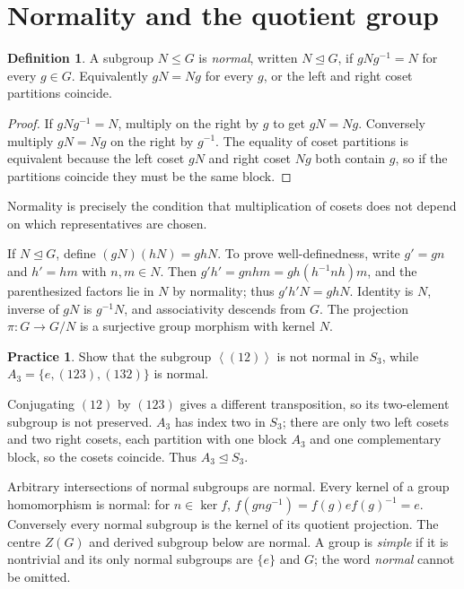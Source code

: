 \documentclass[11pt,openany]{book}
\newcommand{\angles}[1]{\left\langle#1\right\rangle}
\theoremstyle{definition}
\newtheorem{definition}[theorem]{Definition}
\newtheorem{exercise}[theorem]{Practice}
\begin{document}
\section{Normality and the quotient group}
\begin{definition}A subgroup $N\le G$ is \emph{normal}, written $N\trianglelefteq G$, if $gNg^{-1}=N$ for every $g\in G$. Equivalently $gN=Ng$ for every $g$, or the left and right coset partitions coincide.\end{definition}
\begin{proof}If $gNg^{-1}=N$, multiply on the right by $g$ to get $gN=Ng$. Conversely multiply $gN=Ng$ on the right by $g^{-1}$. The equality of coset partitions is equivalent because the left coset $gN$ and right coset $Ng$ both contain $g$, so if the partitions coincide they must be the same block.\end{proof}
\begin{intuition}Normality is precisely the condition that multiplication of cosets does not depend on which representatives are chosen.\end{intuition}
If $N\trianglelefteq G$, define $(gN)(hN)=ghN$. To prove well-definedness, write $g'=gn$ and $h'=hm$ with $n,m\in N$. Then $g'h'=gnhm=gh(h^{-1}nh)m$, and the parenthesized factors lie in $N$ by normality; thus $g'h'N=ghN$. Identity is $N$, inverse of $gN$ is $g^{-1}N$, and associativity descends from $G$. The projection $\pi:G\to G/N$ is a surjective group morphism with kernel $N$.
\begin{exercise}Show that the subgroup $\angles{(12)}$ is not normal in $S_3$, while $A_3=\{e,(123),(132)\}$ is normal.\end{exercise}
\begin{solution}Conjugating $(12)$ by $(123)$ gives a different transposition, so its two-element subgroup is not preserved. $A_3$ has index two in $S_3$; there are only two left cosets and two right cosets, each partition with one block $A_3$ and one complementary block, so the cosets coincide. Thus $A_3\trianglelefteq S_3$.\end{solution}
Arbitrary intersections of normal subgroups are normal. Every kernel of a group homomorphism is normal: for $n\in\ker f$, $f(gng^{-1})=f(g)ef(g)^{-1}=e$. Conversely every normal subgroup is the kernel of its quotient projection. The centre $Z(G)$ and derived subgroup below are normal. A group is \emph{simple} if it is nontrivial and its only normal subgroups are $\{e\}$ and $G$; the word \emph{normal} cannot be omitted.
\end{document}
